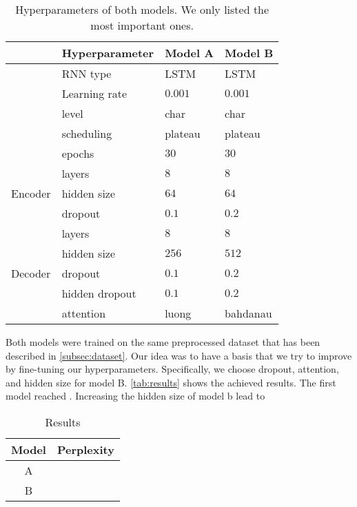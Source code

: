 \documentclass[11pt,a4paper]{article}
\begin{document}
\begin{table}[]
\centering
\caption{Hyperparameters of both models. We only listed the most important ones.}
\begin{tabular}{ll|l|l}
                         & Hyperparameter & Model A  & Model B \\\hline
                         & RNN type       & LSTM     & LSTM    \\
                         & Learning rate  & $0.001$  & $0.001$ \\
                         & level          & char     & char    \\
                         & scheduling     & plateau  & plateau \\
                         & epochs         & $30$     & $30$      \\\hline
\multirow{3}{*}{Encoder} & layers         & $8$      & $8$       \\
                         & hidden size    & $64$     & $64$      \\
                         & dropout        & $0.1$    & $0.2$     \\\hline
\multirow{5}{*}{Decoder} & layers         & $8$      & $8$       \\
                         & hidden size    & $256$    & $512$     \\
                         & dropout        & $0.1$    & $0.2$     \\
                         & hidden dropout & $0.1$    & $0.2$     \\
                         & attention      & luong    & bahdanau\\    
\end{tabular}
\label{tab:parameters}
\end{table}

Both models were trained on the same preprocessed dataset that has been described in \autoref{subsec:dataset}. Our idea was to have a basis that we try to improve by fine-tuning our hyperparameters. Specifically, we choose dropout, attention, and hidden size for model B. \autoref{tab:results} shows the achieved results. The first model reached . Increasing the hidden size of model b lead to 

\begin{table}[]
    \centering
    \caption{Results}
    \begin{tabular}{c|c}
        Model & Perplexity\\
        \hline
        A     &  \\
        B     & 
    \end{tabular}
    
    \label{tab:results}
\end{table}
\end{document}
